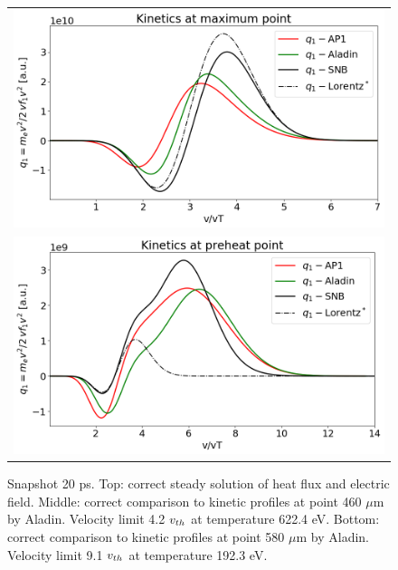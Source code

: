 \begin{figure}[htb]
\begin{center}
\begin{tabular}{c}
      \includegraphics[width=\figscale\textwidth]{../VFPdata/C7_Aladin_case5_kinetics.png} \\
	  \includegraphics[width=\figscale\textwidth]{../VFPdata/C7_Aladin_case5_nonlocal_kinetics.png} 
    \end{tabular}
  \caption{  
  Snapshot 20 ps. Top: correct steady solution of heat flux and electric field. 
  Middle: correct comparison to kinetic profiles at point 460 $\mu$m by Aladin. 
  Velocity limit 4.2 $v_{th}$ at temperature 622.4 eV.
  Bottom: correct comparison to kinetic profiles at point 580 $\mu$m by Aladin.
  Velocity limit 9.1 $v_{th}$ at temperature 192.3 eV.
  }
  \label{fig:C7_Aladin_case5}
  \end{center} 
\end{figure}

